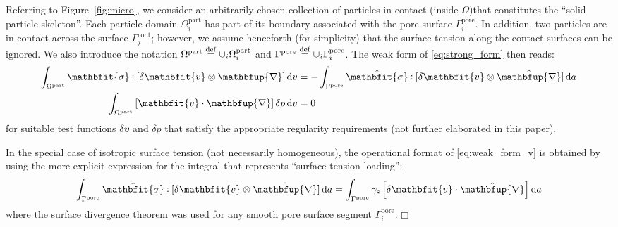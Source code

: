 \documentclass[12pt,a4paper,fleqn]{article}
\renewcommand{\ta}[1]{\mathbfit{#1}}
\renewcommand{\ts}[1]{\mathbfit{#1}}
\renewcommand{\diff}{\mathbfup{\nabla}}
\renewcommand{\Box}{\mdlgwhtsquare}
\newcommand{\figref}[1]{Figure~\ref{#1}}
\newcommand{\pore}{\mathrm{pore}}
\newcommand{\particle}{\mathrm{part}}
\newcommand{\contact}{\mathrm{cont}}
\newcommand{\surf}{\mathrm{s}}
\begin{document}

Referring to \figref{fig:micro}, we consider an arbitrarily chosen collection of particles in contact (inside $\Omega$)that constitutes the ``solid particle skeleton''.
Each particle domain $\Omega_i^\particle$ has part of its boundary associated with the pore surface $\Gamma_i^\pore$.
In addition, two particles are in contact across the surface $\Gamma_j^\contact$; however, we assume henceforth (for simplicity) that the surface tension along the contact surfaces can be ignored. We also introduce the notation $\Omega^\particle \defeq\cup_i\Omega_i^\particle$ and $\Gamma^\pore \defeq \cup_i\Gamma^\pore_i$.
The weak form of \eqref{eq:strong_form} then reads:
\begin{subequations}\label{eq:weak_form}
\begin{align}
    \int_{\Omega^\particle} \ts{\sigma}\dprod[\delta \ta v\outerp\diff] \dif v
    & =
    -\int_{\Gamma^\pore} \hat{\ts\sigma} \dprod [\delta\ta{v}\outerp\hat{\diff}] \dif a
\label{eq:weak_form_v} \\
    \int_{\Omega^\particle} \left[\ta{v}\cdot\diff\right] \delta p \dif v
    & =  0
\label{eq:weak_form_p}
\end{align}
\end{subequations}
for suitable test functions $\delta\ta{v}$ and $\delta p$ that satisfy the appropriate regularity requirements (not further elaborated in this paper).

In the special case of isotropic surface tension (not necessarily homogeneous), the operational format of \eqref{eq:weak_form_v} is obtained by using the more explicit expression for the integral that represents ``surface tension loading'':
\begin{equation}
    \int_{\Gamma^\pore} \hat{\ts\sigma} \dprod [\delta\ta{v}\outerp\hat{\diff}] \dif a =
    \int_{\Gamma^\pore} \gamma_\surf\left[\delta\ta{v}\cdot\hat{\diff}\right] \dif a
\label{eq:surface_traction_weak}
\end{equation}
where the surface divergence theorem was used for any smooth pore surface segment $\Gamma^\pore_i$. $\Box$
\end{document}
